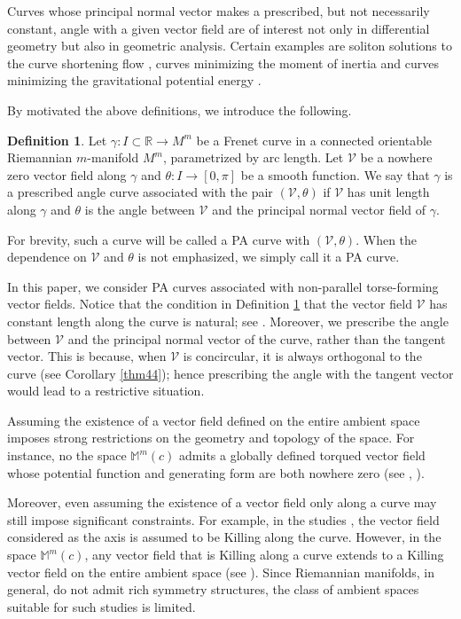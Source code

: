 \documentclass[12pt]{amsart}
\def\r{\mathbb R}
\def\m{\mathbb M}
\def\v{\mathcal V}
\theoremstyle{definition}
\newtheorem{definition}[theorem]{Definition}
\begin{document}
Curves whose principal normal vector makes a prescribed, but not necessarily constant, angle with a given vector field are of interest not only in differential geometry but also in geometric analysis. Certain examples are soliton solutions to the curve shortening flow \cite{kl,lo1}, curves minimizing the moment of inertia \cite{eul,lo3} and curves minimizing the gravitational potential energy \cite{die,lo2}.

By motivated the above definitions, we introduce the following.

\begin{definition}\label{int-def}
Let $\gamma:I\subset \r \to M^m$ be a Frenet curve in a connected orientable Riemannian $m$-manifold $M^m$, parametrized by arc length. Let $\v$ be a nowhere zero vector field along $\gamma$ and $\theta:I\to[0,\pi]$ be a smooth function. We say that $\gamma$ is a prescribed angle curve associated with the pair $(\v,\theta)$ if $\v$ has unit length along $\gamma$ and $\theta$ is the angle between $\v$ and the principal normal vector field  of $\gamma$.
\end{definition}

For brevity, such a curve will be called a PA curve with $(\v,\theta)$. When the dependence on $\v$ and $\theta$ is not emphasized, we simply call it a PA curve. 

In this paper, we consider PA curves associated with non-parallel torse-forming vector fields. Notice that the condition in Definition \ref{int-def} that the vector field $\v$ has constant length along the curve  is natural; see \cite{bar,dgd,lo,loy6,loy7}. Moreover, we prescribe the angle between $\v$ and the principal normal vector of the curve, rather than the tangent vector. This is because, when $\v$ is concircular, it is always orthogonal to the curve (see Corollary \ref{thm44}); hence prescribing the angle with the tangent vector would lead to a restrictive situation.

Assuming the existence of a vector field defined on the entire ambient space imposes strong restrictions on the geometry and topology of the space. For instance, no the space $\m^m(c)$ admits a globally defined torqued vector field whose potential function and generating form are both nowhere zero (see \cite[Theorem 4.1]{amc}, \cite[Theorems 1, 2]{dta}). 

Moreover, even assuming the existence of a vector field only along a curve may still impose significant constraints. For example, in the studies \cite{bar,lo,loy2}, the vector field considered as the axis is assumed to be Killing along the curve. However, in the space $\m^m(c)$, any vector field that is Killing along a curve extends to a Killing vector field on the entire ambient space (see \cite[Lemma 1]{bar}). Since Riemannian manifolds, in general, do not admit rich symmetry structures, the class of ambient spaces suitable for such studies is limited.
\end{document}
